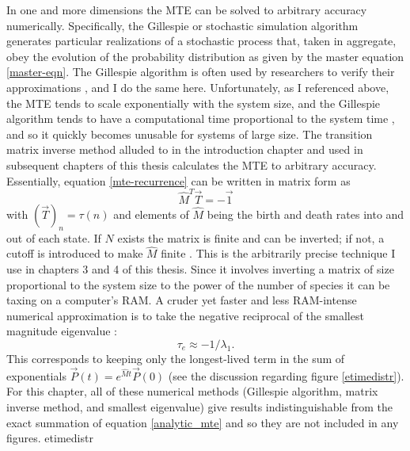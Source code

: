 In one and more dimensions the MTE can be solved to arbitrary accuracy numerically. %
Specifically, the Gillespie or stochastic simulation algorithm \cite{Gillespie1977,Cao2006} generates particular realizations of a stochastic process that, taken in aggregate, obey the evolution of the probability distribution as given by the master equation \ref{master-eqn}. %
The Gillespie algorithm is often used by researchers to verify their approximations \cite{Reichenbach2006,Black2012,Dobrinevski2012,Chotibut2015,Constable2015,Gooding-townsend2015,Young2018}, and I do the same here. %
Unfortunately, as I referenced above, the MTE tends to scale exponentially with the system size, and the Gillespie algorithm tends to have a computational time proportional to the system time \cite{Gillespie1977}, and so it quickly becomes unusable for systems of large size. %
The transition matrix inverse method alluded to in the introduction chapter and used in subsequent chapters of this thesis calculates the MTE to arbitrary accuracy. 
Essentially, equation \ref{mte-recurrence} can be written in matrix form as \cite{Nisbet1982,Iyer-Biswas2015}
\begin{equation}
\hat{M}^T\vec{T} = -\vec{1}
 \label{matrix-method}
\end{equation}
with $\left(\vec{T}\right)_n = \tau(n)$ and elements of $\hat{M}$ being the birth and death rates into and out of each state. 
If $N$ exists the matrix is finite and can be inverted; if not, a cutoff is introduced to make $\hat{M}$ finite \cite{Munsky2006,Parsons2007,Parsons2010}. 
This is the arbitrarily precise technique I use in chapters 3 and 4 of this thesis. 
Since it involves inverting a matrix of size proportional to the system size to the power of the number of species it can be taxing on a computer's RAM. 
A cruder yet faster and less RAM-intense numerical approximation is to take the negative reciprocal of the smallest magnitude eigenvalue \cite{Hanggi1990}:
\begin{equation}
 \tau_e \approx -1/\lambda_1. 
\end{equation}
This corresponds to keeping only the longest-lived term in the sum of exponentials $\vec{P}(t)=e^{\hat{M}t}\vec{P}(0)$ (see the discussion regarding figure \ref{etimedistr}). 
For this chapter, all of these numerical methods (Gillespie algorithm, matrix inverse method, and smallest eigenvalue) give results indistinguishable from the exact summation of equation \ref{analytic_mte} and so they are not included in any figures. 
{etimedistr}

